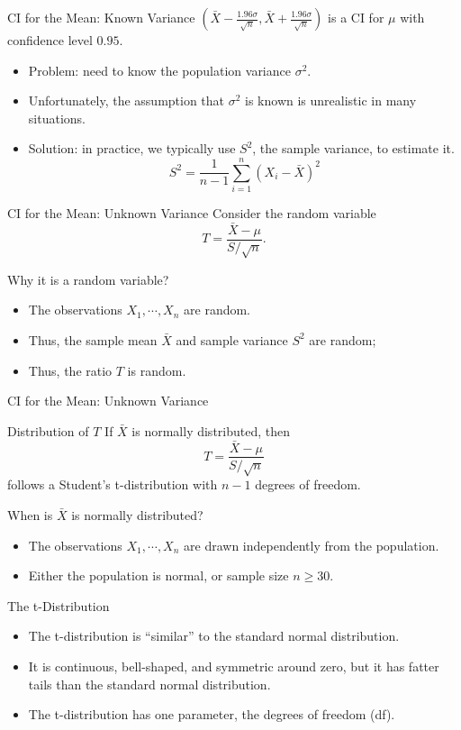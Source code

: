 \documentclass{beamer}
\begin{document}
\begin{frame}{CI for the Mean: Known Variance}
$(\bar X - \frac{1.96 \sigma}{\sqrt{n}},\bar X + \frac{1.96 \sigma}{\sqrt{n}})$ is 
a CI for $\mu$ with confidence level $0.95$.
\begin{itemize}
\item Problem: need to know the population variance $\sigma^2$.
\item Unfortunately, the assumption that $\sigma^2$ is known is unrealistic in many situations. 
\item Solution: in practice, we typically use $S^2$, the sample variance, to estimate it.
\[
S^2 = \frac{1}{n-1} \sum_{i=1}^n (X_i - \bar X)^2
\]
\end{itemize}
\end{frame}

\begin{frame}{CI for the Mean: \alert{Unknown} Variance}
Consider the random variable
\[
T = \frac{\bar X - \mu} {S / \sqrt{n}}.
\]

Why it is a random variable?
\begin{itemize}
\item The observations $X_1,\cdots,X_n$ are random.
\item Thus, the sample mean $\bar X$ and sample variance $S^2$ are random;
\item Thus, the ratio $T$ is random.
\end{itemize}

\end{frame}

\begin{frame}{CI for the Mean: Unknown Variance}
\begin{block}{Distribution of $T$}
If $\bar X$ is normally distributed, then 
\[T = \frac{\bar X - \mu} {S / \sqrt{n}} \]
follows a \alert{Student's t-distribution} with $n-1$ degrees of freedom. 
\end{block}
When is $\bar X$ is normally distributed?
\begin{itemize}
\item The observations $X_1,\cdots,X_n$ are drawn independently from the population.
\item Either the population is normal, or sample size $n\geq 30$.
\end{itemize}
\end{frame}

\begin{frame}{The t-Distribution}
\begin{itemize}
\item The t-distribution is ``similar'' to the standard normal distribution.
\item It is continuous, bell-shaped, and symmetric around zero, but it has fatter tails than the standard normal distribution.
\item The t-distribution has one parameter, the degrees of freedom (df).
\end{itemize}
\end{frame}
\end{document}

